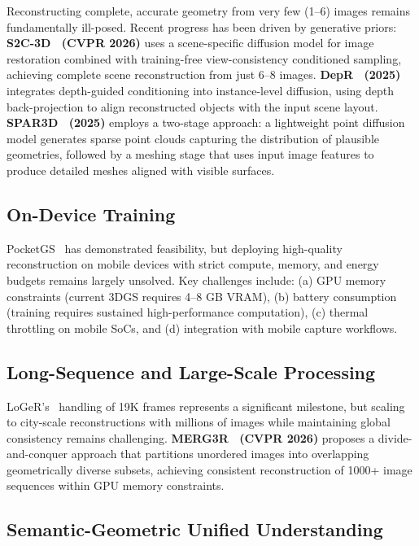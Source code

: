 \documentclass[journal]{IEEEtran}
\begin{document}
Reconstructing complete, accurate geometry from very few (1--6) images remains fundamentally ill-posed. Recent progress has been driven by generative priors: \textbf{S2C-3D~\cite{s2c3d} (CVPR 2026)} uses a scene-specific diffusion model for image restoration combined with training-free view-consistency conditioned sampling, achieving complete scene reconstruction from just 6--8 images. \textbf{DepR~\cite{depr} (2025)} integrates depth-guided conditioning into instance-level diffusion, using depth back-projection to align reconstructed objects with the input scene layout. \textbf{SPAR3D~\cite{spar3d} (2025)} employs a two-stage approach: a lightweight point diffusion model generates sparse point clouds capturing the distribution of plausible geometries, followed by a meshing stage that uses input image features to produce detailed meshes aligned with visible surfaces.

\subsection{On-Device Training}

PocketGS~\cite{pocketgs} has demonstrated feasibility, but deploying high-quality reconstruction on mobile devices with strict compute, memory, and energy budgets remains largely unsolved. Key challenges include: (a) GPU memory constraints (current 3DGS requires 4--8 GB VRAM), (b) battery consumption (training requires sustained high-performance computation), (c) thermal throttling on mobile SoCs, and (d) integration with mobile capture workflows.

\subsection{Long-Sequence and Large-Scale Processing}

LoGeR's~\cite{loger} handling of 19K frames represents a significant milestone, but scaling to city-scale reconstructions with millions of images while maintaining global consistency remains challenging. \textbf{MERG3R~\cite{merg3r} (CVPR 2026)} proposes a divide-and-conquer approach that partitions unordered images into overlapping geometrically diverse subsets, achieving consistent reconstruction of 1000+ image sequences within GPU memory constraints.

\subsection{Semantic-Geometric Unified Understanding}
\end{document}
